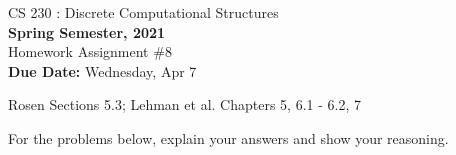 \documentclass[11pt]{article}
\begin{document}
    \begin{center}
    {{\large CS 230 : Discrete Computational Structures}}
        \\


        {\bf Spring Semester, 2021}\\

        {\sc Homework Assignment \#8}\\
        {\bf Due Date:}  Wednesday, Apr 7
    \end{center}

     Rosen Sections 5.3; Lehman et al. Chapters 5, 6.1 - 6.2, 7

    For the problems below, explain your answers and show your reasoning.
\end{document}
